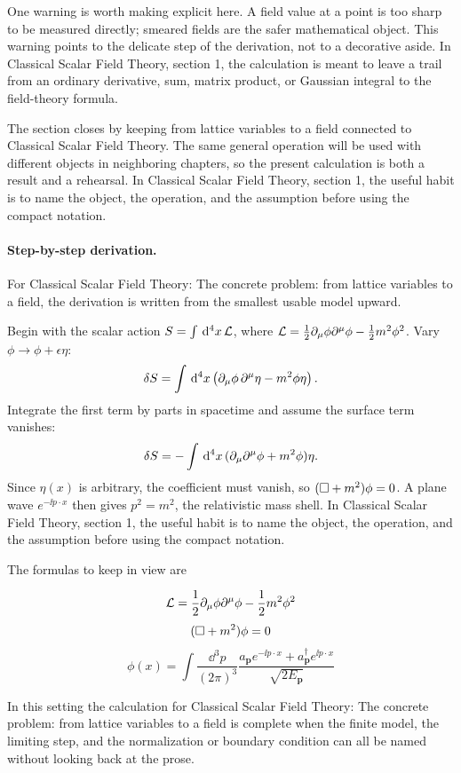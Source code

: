 One warning is worth making explicit here.  A field value at a point is too sharp to be measured directly; smeared fields are the safer mathematical object.  This warning points to the delicate step of the derivation, not to a decorative aside.  In Classical Scalar Field Theory, section 1, the calculation is meant to leave a trail from an ordinary derivative, sum, matrix product, or Gaussian integral to the field-theory formula.

The section closes by keeping from lattice variables to a field connected to Classical Scalar Field Theory.  The same general operation will be used with different objects in neighboring chapters, so the present calculation is both a result and a rehearsal.  In Classical Scalar Field Theory, section 1, the useful habit is to name the object, the operation, and the assumption before using the compact notation.



\paragraph{Step-by-step derivation.}

For Classical Scalar Field Theory: The concrete problem: from lattice variables to a field, the derivation is written from the smallest usable model upward.

Begin with the scalar action \(S=\int\,\mathrm d^4x\,\mathcal L\), where \(\mathcal L=\frac12\partial_\mu\phi\partial^\mu\phi-\frac12m^2\phi^2\).  Vary \(\phi\to\phi+\epsilon\eta\):
\[
  \delta S=\int\,\mathrm d^4x\left(\partial_\mu\phi\,\partial^\mu\eta-m^2\phi\eta\right).
\]
Integrate the first term by parts in spacetime and assume the surface term vanishes:
\[
  \delta S=-\int\,\mathrm d^4x\,(\partial_\mu\partial^\mu\phi+m^2\phi)\eta.
\]
Since \(\eta(x)\) is arbitrary, the coefficient must vanish, so \((\Box+m^2)\phi=0\).  A plane wave \(e^{-\ii p\cdot x}\) then gives \(p^2=m^2\), the relativistic mass shell.  In Classical Scalar Field Theory, section 1, the useful habit is to name the object, the operation, and the assumption before using the compact notation.

The formulas to keep in view are

\[
  \mathcal L=\frac12\partial_\mu\phi\partial^\mu\phi-\frac12m^2\phi^2
\]
\[
  (\Box+m^2)\phi=0
\]
\[
  \phi(x)=\int\frac{\dd^3p}{(2\pi)^3}\frac{a_{\bm p}e^{-\ii p\cdot x}+a_{\bm p}^\dagger e^{\ii p\cdot x}}{\sqrt{2E_{\bm p}}}
\]

In this setting the calculation for Classical Scalar Field Theory: The concrete problem: from lattice variables to a field is complete when the finite model, the limiting step, and the normalization or boundary condition can all be named without looking back at the prose.




